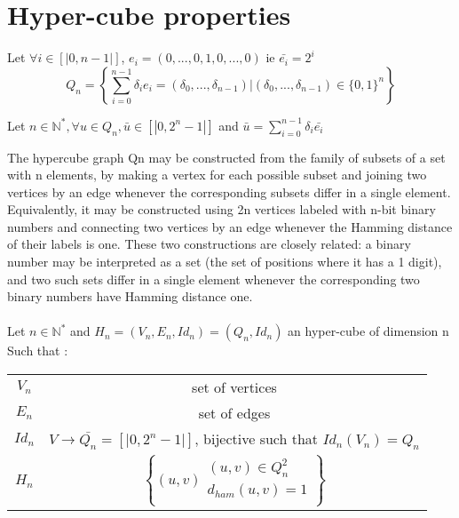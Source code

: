 \section{Hyper-cube properties}
\begin{definition}
  Let $\forall i \in [|0,n-1|]$, $e_{i} = (0,...,0,1,0,...,0)$ ie $\bar{e_{i}} = 2^{i}$ \\
  $$Q_{n} = \left\{ \sum_{i=0}^{n-1}{ \delta_{i}e_{i} } = (\delta_{0}, ..., \delta_{n-1}) | (\delta_{0}, ..., \delta_{n-1}) \in \{0,1\}^{n} \right\}$$
\end{definition}
\begin{remarque} 
  Let $n \in \mathbb{N}^{*}, \forall u \in Q_{n}, \bar{u} \in [|0, 2^{n}-1|]$ and $\bar{u} = \sum_{i=0}^{n-1}{ \delta_{i}\bar{e_{i}} }$
\end{remarque}

\begin{definition}%
  The hypercube graph Qn may be constructed from the family of subsets of a set with n elements, by making a vertex for each 
  possible subset and joining two vertices by an edge whenever the corresponding subsets differ in a single element. 
  Equivalently, it may be constructed using 2n vertices labeled with n-bit binary numbers and connecting two vertices by an 
  edge whenever the Hamming distance of their labels is one. These two constructions are closely related: a binary number may 
  be interpreted as a set (the set of positions where it has a 1 digit), and two such sets differ in a single element whenever 
  the corresponding two binary numbers have Hamming distance one.\\\\
  Let $n \in \mathbb{N}^{*}$ and $H_{n}=(V_{n}, E_{n}, Id_{n}) = (Q_{n}, Id_{n})$ an hyper-cube of dimension n\\
  Such that :
  \begin{tabular}{cc}
    $V_{n}$ & set of vertices\\
    $E_{n}$ & set of edges\\
    $Id_{n}$ & $V \rightarrow \bar{Q_{n}}=[|0, 2^{n}-1|]$, bijective such that $Id_{n}(V_{n})=Q_{n}$\\
    $H_{n}$  & $\left\{ (u,v) 
		\begin{array}{l}
		  (u,v) \in Q_{n}^{2}\\
		  d_{ham}(u,v) = 1\\
		\end{array}
		\right\}$\\
  \end{tabular}
\end{definition}


